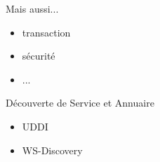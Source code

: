 {  \begin{frame}
    \begin{block}{Mais aussi...}
      \begin{itemize}
        \item transaction
        \item sécurité
        \item ...
      \end{itemize}
    \end{block}

    \begin{block}{Découverte de Service et Annuaire}
      \begin{itemize}
        \item UDDI
        \item WS-Discovery
      \end{itemize}
    \end{block}
  \end{frame}
}

